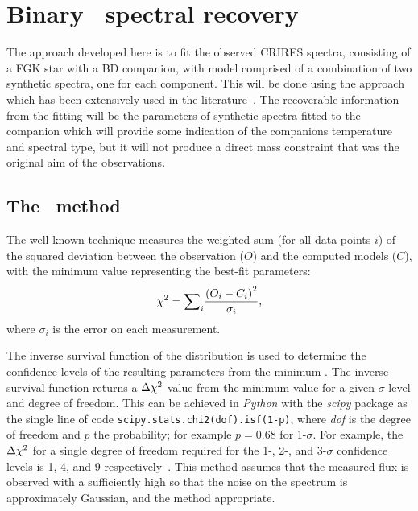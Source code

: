 

\section{Binary \texorpdfstring{\textchisquared}\ \ spectral recovery}
\label{subsec:companion_recovery}
The approach developed here is to fit the observed CRIRES spectra, consisting of a FGK star with a {BD} companion, with model comprised of a combination of two synthetic spectra, one for each component.
This will be done using the \textchisquared{} approach which has been extensively used in the literature~\citep[e.g.][to list a few]{astudillo-defru_harps_2015, passegger_fundamental_2016, passegger_carmenes_2018, zechmeister_spectrum_2018, nemravova_xtauri_2016, kolbl_detection_2015, rajpurohit_spectral_2018}.
The recoverable information from the fitting will be the parameters of synthetic spectra fitted to the companion which will provide some indication of the companions temperature and spectral type, but it will not produce a direct mass constraint that was the original aim of the observations.

\subsection{The \texorpdfstring{\textchisquared}\ \ method}
\label{subsec:chi2}

The well known \textchisquared{} technique measures the weighted sum (for all data points \(i\)) of the squared deviation between the observation (\({O}\)) and the computed models (\({C}\)), with the minimum \textchisquared{} value representing the best-fit parameters:
\[{\chi}^{2} = {\sum}_i \frac{{(O_{i} - {C}_{i})}^2}{{\sigma}_{i}},\] where \({\sigma}_{i}\) is the error on each measurement.

The inverse survival function of the \textchisquared{} distribution is used to determine the confidence levels of the resulting parameters from the minimum \textchisquared{}.
The inverse survival function returns a \(\Delta{\chi}^{2}\) value from the minimum \textchisquared{} value for a given $\sigma$ level and degree of freedom.
This can be achieved in \emph{Python} with the \emph{scipy} package as the single line of code \texttt{scipy.stats.chi2{(dof)}.isf{(1-p)}}, where \textit{dof} is the degree of freedom and \(p\) the probability; for example \(p = 0.68\) for 1-\(\sigma\).
For example, the \(\Delta {\chi}^{2}\) for a single degree of freedom required for the 1-, 2-, and 3-\(\sigma\) confidence levels is 1, 4, and 9 respectively~\citep{bevington_data_2003}.
This method assumes that the measured flux is observed with a \snr{} sufficiently high so that the noise on the spectrum is approximately Gaussian, and the \textchisquared{} method appropriate.

